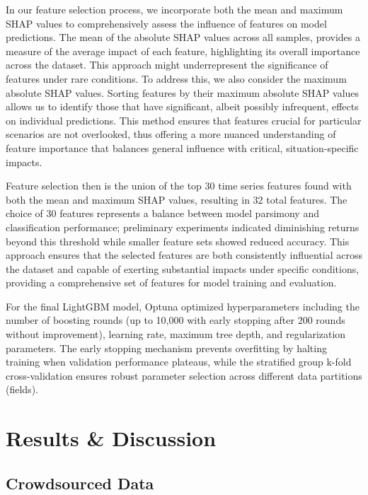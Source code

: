 \documentclass[
  journal,
  twocolumn]{IEEEtran}
\begin{document}
In our feature selection process, we incorporate both the mean and
maximum SHAP values to comprehensively assess the influence of features
on model predictions. The mean of the absolute SHAP values across all
samples, provides a measure of the average impact of each feature,
highlighting its overall importance across the dataset. This approach
might underrepresent the significance of features under rare conditions.
To address this, we also consider the maximum absolute SHAP values.
Sorting features by their maximum absolute SHAP values allows us to
identify those that have significant, albeit possibly infrequent,
effects on individual predictions. This method ensures that features
crucial for particular scenarios are not overlooked, thus offering a
more nuanced understanding of feature importance that balances general
influence with critical, situation-specific impacts.

Feature selection then is the union of the top 30 time series features
found with both the mean and maximum SHAP values, resulting in 32 total
features. The choice of 30 features represents a balance between model
parsimony and classification performance; preliminary experiments
indicated diminishing returns beyond this threshold while smaller
feature sets showed reduced accuracy. This approach ensures that the
selected features are both consistently influential across the dataset
and capable of exerting substantial impacts under specific conditions,
providing a comprehensive set of features for model training and
evaluation.

For the final LightGBM model, Optuna optimized hyperparameters including
the number of boosting rounds (up to 10,000 with early stopping after
200 rounds without improvement), learning rate, maximum tree depth, and
regularization parameters. The early stopping mechanism prevents
overfitting by halting training when validation performance plateaus,
while the stratified group k-fold cross-validation ensures robust
parameter selection across different data partitions (fields).

\section{Results \& Discussion}\label{results-discussion}

\subsection{Crowdsourced Data}\label{crowdsourced-data}
\end{document}
